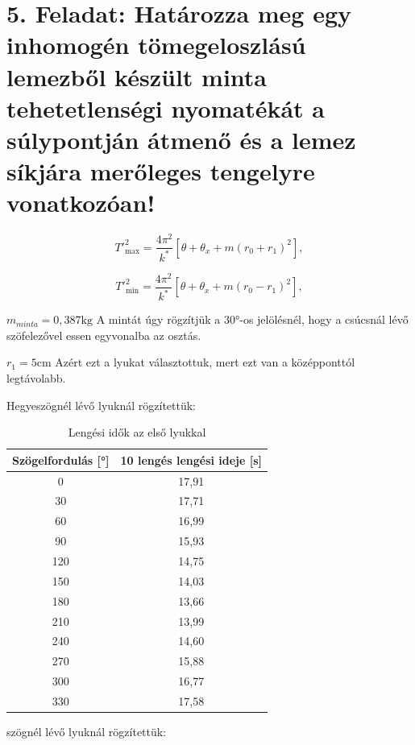 \documentclass{article}
\begin{document}

\section*{5. Feladat: Határozza meg egy inhomogén tömegeloszlású lemezből készült minta tehetetlenségi nyomatékát a súlypontján átmenő és a lemez síkjára merőleges tengelyre vonatkozóan!}

\[
T'^2_{\max} = \frac{4\pi^2}{k^*} \left[ \theta + \theta_x + m(r_0 + r_1)^2 \right],
\]

\[
T'^2_{\min} = \frac{4\pi^2}{k^*} \left[ \theta + \theta_x + m(r_0 - r_1)^2 \right],
\]


$m_{minta}= 0,387 \text{kg}$
A mintát úgy rögzítjük a 30°-os jelölésnél, hogy a csúcsnál lévő szöfelezővel essen egyvonalba az osztás.

$r_{1}= 5 \text{cm}$
Azért ezt a lyukat választottuk, mert ezt van a középponttól legtávolabb.

Hegyeszögnél lévő lyuknál rögzítettük:

\begin{table}[H]
    \centering
    \begin{tabular}{|c|c|}
        \hline
        Szögelfordulás [°] & 10 lengés lengési ideje [s] \\ \hline
         0 & 17,91 \\ \hline 
         30 & 17,71 \\ \hline
         60 & 16,99 \\ \hline 
         90 & 15,93 \\ \hline
         120 & 14,75 \\ \hline 
         150 & 14,03 \\ \hline
         180 & 13,66 \\ \hline
         210 & 13,99 \\ \hline
         240 & 14,60 \\ \hline
         270 & 15,88 \\ \hline
         300 & 16,77 \\ \hline
         330 & 17,58\\ \hline
        
    \end{tabular}
    \caption{Lengési idők az első lyukkal}
    \label{tab:lengesiido_1.1}
\end{table}

szögnél lévő lyuknál rögzítettük:
\end{document}
